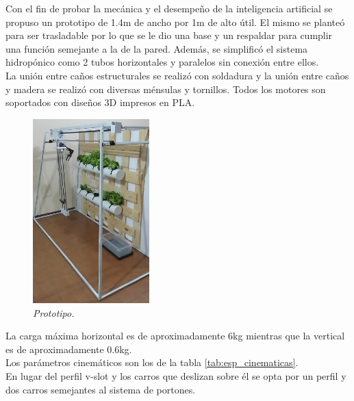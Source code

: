 Con el fin de probar la mecánica y el desempeño de la inteligencia artificial se propuso un prototipo de 1.4m de ancho por 1m de alto útil. El mismo se planteó para ser trasladable por lo que se le dio una base y un respaldar para cumplir una función semejante a la de la pared. Además, se simplificó el sistema hidropónico como 2 tubos horizontales y paralelos sin conexión entre ellos.\\
La unión entre caños estructurales se realizó con soldadura y la unión entre caños y madera se realizó con diversas ménsulas y tornillos. Todos los motores son soportados con diseños 3D impresos en PLA.
\begin{figure}[H]
    \centering
        \includegraphics[width=0.4\textwidth]{img/estructura.jpg}
        \caption{\textit{Prototipo.}}
        \label{fig:estructura}
\end{figure}

La carga máxima horizontal es de aproximadamente 6kg mientras que la vertical es de aproximadamente 0.6kg.\\
Los parámetros cinemáticos son los de la tabla \ref{tab:esp_cinematicas}.\\

En lugar del perfil v-slot y los carros que deslizan sobre él se opta por un perfil y dos carros semejantes al sistema de portones.\\

